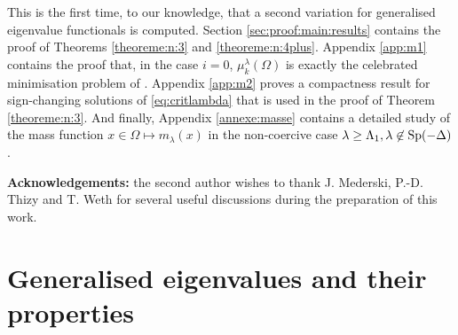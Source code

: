 \documentclass[10pt]{amsart}
\numberwithin{equation}{section}
\newcommand{\Sp}{{\rm Sp}}
\newcommand{\Om}{\Omega}
\newcommand{\mkl}{\mu_{k}^{\lambda}}
\theoremstyle{plain}
\theoremstyle{remark}
\begin{document}
This is the first time, to our knowledge, that a second variation for generalised eigenvalue functionals is computed. Section \ref{sec:proof:main:results} contains the proof of Theorems \ref{theoreme:n:3} and \ref{theoreme:n:4plus}. Appendix \ref{app:m1} contains the proof that, in the case $i=0$, $\mkl(\Om)$ is exactly the celebrated minimisation problem of \cite{BN}. Appendix \ref{app:m2} proves a compactness result for sign-changing solutions of \eqref{eq:critlambda} that is used in the proof of Theorem \ref{theoreme:n:3}. And finally, Appendix \ref{annexe:masse} contains a detailed study of the mass function $x \in \Om \mapsto m_\lambda(x)$ in the non-coercive case $\lambda \ge \Lambda_1, \lambda \not \in \Sp(-\Delta)$.


\medskip

\textbf{Acknowledgements:} the second author wishes to thank J. Mederski, P.-D. Thizy and T. Weth for several useful discussions during the preparation of this work. 




\section{Generalised eigenvalues and their properties} \label{eigenvalues}
\end{document}
